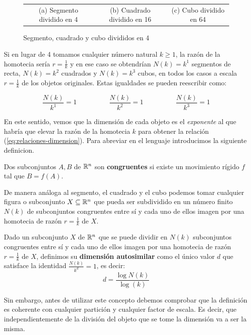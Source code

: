 \begin{figure}[h]
\begin{tabular}{ccc}
(a) Segmento dividido en 4 & (b) Cuadrado dividido en 16 & (c) Cubo dividido en 64 \\[4pt]
\end{tabular}
\caption{Segmento, cuadrado y cubo divididos en 4}
\label{fig:divisiones}
\end{figure}

Si en lugar de 4 tomamos cualquier número natural $k\geq 1$, la razón de la homotecia sería $r=\frac 1 k$ y en ese caso se obtendrían $N(k)=k^1$ segmentos de recta, $N(k)=k^2$ cuadrados y $N(k)=k^3$ cubos, en todos los casos a escala $r=\frac 1 k$ de los objetos originales. Estas igualdades se pueden reescribir como:

\begin{equation}\label{eq:relaciones-dimension}
\frac{N(k)}{k^1}=1 \hspace{2cm} \frac{N(k)}{k^2}=1 \hspace{2cm} \frac{N(k)}{k^3}=1
\end{equation}

En este sentido, vemos que la dimensión de cada objeto es el \textit{exponente} al que habría que elevar la razón de la homotecia $k$ para obtener la relación (\ref{eq:relaciones-dimension}). Para abreviar en el lenguaje introducimos la siguiente definicion.

\begin{definicion}[Congruencia]
Dos subconjuntos $A,B$ de $\mathbb{R}^n$ son \textbf{congruentes} si existe un movimiento rígido $f$ tal que $B = f(A)$.
\end{definicion}

De manera análoga al segmento, el cuadrado y el cubo podemos tomar cualquier figura o subconjunto $X\subseteq \mathbb{R}^n$ que pueda ser subdividido en un número finito $N(k)$ de subconjuntos congruentes entre sí y cada uno de ellos imagen por una homotecia de razón $r=\frac 1 k$ de $X$. 

\begin{definicion}
Dado un subconjunto $X$ de $\mathbb{R}^n$ que se puede dividir en $N(k)$ subconjuntos congruentes entre sí y cada uno de ellos imagen por una homotecia de razón $r=\frac 1 k$ de $X$, definimos su \textbf{dimensión autosimilar} como el único valor $d$ que satisface la identidad $\frac{N(k)}{k^d}=1$, es decir: 
$$
d=\frac{\log N(k)}{\log(k)}
$$
\end{definicion}

Sin embargo, antes de utilizar este concepto debemos comprobar que la definición es coherente con cualquier partición y cualquier factor de escala. Es decir, que independientemente de la división del objeto que se tome la dimensión va a ser la misma.


